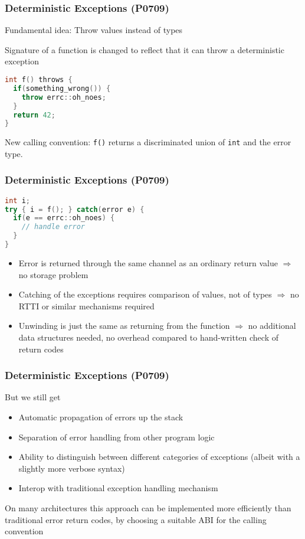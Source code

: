 \documentclass[aspectratio=169]{beamer}
\newif\iftransitions
\newcommand{\cpause}{\iftransitions \pause \fi}
\begin{document}
\begin{frame}[fragile]
  \frametitle{Deterministic Exceptions (P0709)}

  Fundamental idea: Throw values instead of types

  Signature of a function is changed to reflect that it can throw a deterministic exception
  
  \begin{lstlisting}[language={C++}]
int f() throws {
  if(something_wrong()) {
    throw errc::oh_noes;
  }
  return 42;
}
  \end{lstlisting}

  New calling convention: \texttt{f()} returns a discriminated union of \texttt{int} and the error type.
\end{frame}


\begin{frame}[fragile]
  \frametitle{Deterministic Exceptions (P0709)}
  \begin{lstlisting}[language={C++}]
int i;
try { i = f(); } catch(error e) {
  if(e == errc::oh_noes) {
    // handle error
  }
}
  \end{lstlisting}
  
  \begin{itemize}
  \cpause \item Error is returned through the same channel as an ordinary return value $\Rightarrow$ no storage problem
  \cpause \item Catching of the exceptions requires comparison of values, not of types $\Rightarrow$ no RTTI or similar mechanisms required
  \cpause \item Unwinding is just the same as returning from the function $\Rightarrow$ no additional data structures needed, no overhead compared to hand-written check of return codes
  \end{itemize}
\end{frame}


\begin{frame}[fragile]
  \frametitle{Deterministic Exceptions (P0709)}

  But we still get
  \begin{itemize}
  \cpause \item Automatic propagation of errors up the stack
  \cpause \item Separation of error handling from other program logic
  \cpause \item Ability to distinguish between different categories of exceptions (albeit with a slightly more verbose syntax)
  \cpause \item Interop with traditional exception handling mechanism
  \end{itemize}

 \cpause 
  On many architectures this approach can be implemented more efficiently than traditional error return codes, by choosing a suitable ABI for the calling convention
\end{frame}
\end{document}
